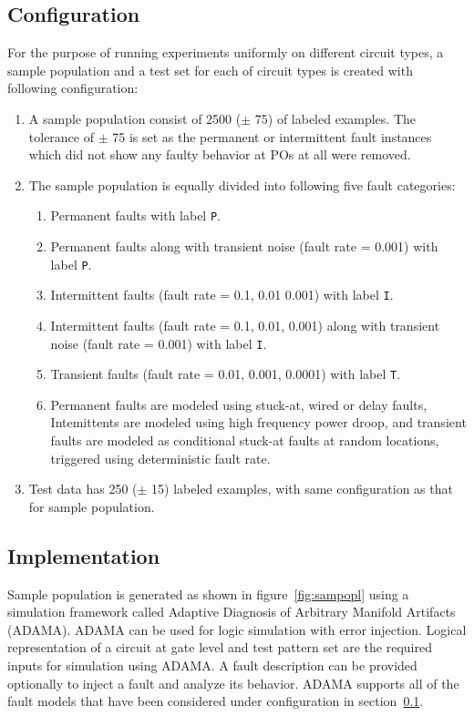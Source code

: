 \subsection{Configuration}
\label{sec:gsp:configuration}
For the purpose of running experiments uniformly on different circuit types, a sample population and a test set for each of circuit types is created with following configuration:
\begin{enumerate}
  \item A sample population consist of 2500 ($\pm$ 75) of labeled examples. The tolerance of $\pm$ 75 is set as the permanent or intermittent fault instances which did not show any faulty behavior at POs at all were removed.
  \item The sample population is equally divided into following five fault categories:
		\begin{enumerate}
    		\item Permanent faults with label \texttt{P}.
    		\item Permanent faults along with transient noise (fault rate = 0.001) with label \texttt{P}.
			\item Intermittent faults (fault rate = 0.1, 0.01 0.001) with label \texttt{I}.
    		\item Intermittent faults (fault rate = 0.1, 0.01, 0.001) along with transient noise (fault rate = 0.001) with label \texttt{I}.
			\item Transient faults (fault rate = 0.01, 0.001, 0.0001) with label \texttt{T}.
		\item Permanent faults are modeled using stuck-at, wired or delay faults, Intemittents are modeled using high frequency power droop, and transient faults are modeled as conditional stuck-at faults at random locations, triggered using deterministic fault rate.
 		 \end{enumerate}
  \item Test data has 250 ($\pm$ 15) labeled examples, with same configuration as that for sample population.
\end{enumerate}

\subsection{Implementation}

Sample population is generated as shown in figure~\ref{fig:sampopl} using a simulation framework called Adaptive Diagnosis of Arbitrary Manifold Artifacts (ADAMA). ADAMA can be used for logic simulation with error injection. Logical representation of a circuit at gate level and test pattern set are the required inputs for simulation using ADAMA. A fault description can be provided optionally to inject a fault and analyze its behavior. ADAMA supports all of the fault models that have been considered under configuration in section~\ref{sec:gsp:configuration}.


